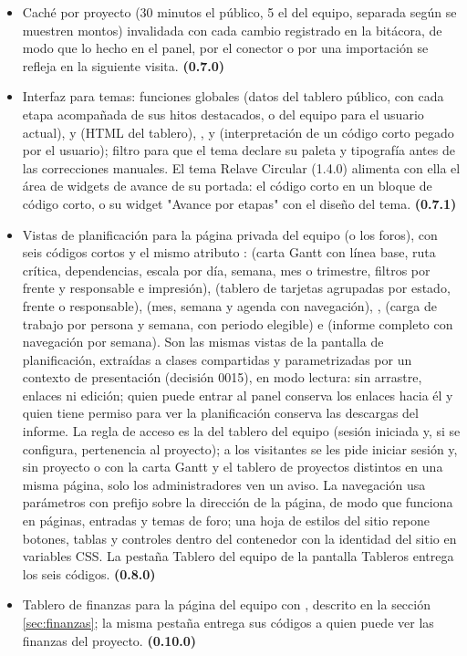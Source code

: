 \documentclass[11pt,a4paper]{article}
\begin{document}
\begin{itemize}
\item Caché por proyecto (30 minutos el público, 5 el del equipo, separada según se muestren montos) invalidada con cada cambio registrado en la bitácora, de modo que lo hecho en el panel, por el conector o por una importación se refleja en la siguiente visita. \textbf{(0.7.0)}
\item Interfaz para temas: funciones globales  (datos del tablero público, con cada etapa acompañada de sus hitos destacados, o del equipo para el usuario actual),  y  (HTML del tablero), ,  y  (interpretación de un código corto pegado por el usuario); filtro  para que el tema declare su paleta y tipografía antes de las correcciones manuales. El tema Relave Circular (1.4.0) alimenta con ella el área de widgets de avance de su portada: el código corto en un bloque de código corto, o su widget "Avance por etapas" con el diseño del tema. \textbf{(0.7.1)}
\item Vistas de planificación para la página privada del equipo (o los foros), con seis códigos cortos y el mismo atributo :  (carta Gantt con línea base, ruta crítica, dependencias, escala por día, semana, mes o trimestre, filtros por frente y responsable e impresión),  (tablero de tarjetas agrupadas por estado, frente o responsable),  (mes, semana y agenda con navegación), ,  (carga de trabajo por persona y semana, con periodo elegible) e  (informe completo con navegación por semana). Son las mismas vistas de la pantalla de planificación, extraídas a clases compartidas y parametrizadas por un contexto de presentación (decisión 0015), en modo lectura: sin arrastre, enlaces ni edición; quien puede entrar al panel conserva los enlaces hacia él y quien tiene permiso para ver la planificación conserva las descargas del informe. La regla de acceso es la del tablero del equipo (sesión iniciada y, si se configura, pertenencia al proyecto); a los visitantes se les pide iniciar sesión y, sin proyecto o con la carta Gantt y el tablero de proyectos distintos en una misma página, solo los administradores ven un aviso. La navegación usa parámetros con prefijo  sobre la dirección de la página, de modo que funciona en páginas, entradas y temas de foro; una hoja de estilos del sitio repone botones, tablas y controles dentro del contenedor  con la identidad del sitio en variables CSS. La pestaña Tablero del equipo de la pantalla Tableros entrega los seis códigos. \textbf{(0.8.0)}
\item Tablero de finanzas para la página del equipo con , descrito en la sección \ref{sec:finanzas}; la misma pestaña entrega sus códigos a quien puede ver las finanzas del proyecto. \textbf{(0.10.0)}
\end{itemize}
\end{document}
